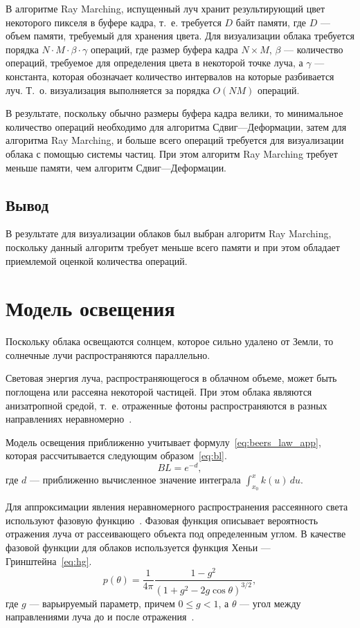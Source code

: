В алгоритме Ray Marching, испущенный луч хранит результирующий цвет некоторого пикселя в буфере кадра, т.~е. требуется $D$ байт памяти, где $D$ --- объем памяти, требуемый для хранения цвета. Для визуализации облака требуется порядка $N \cdot M \cdot \beta \cdot \gamma$ операций, где размер буфера кадра $N \times M$, $\beta$ --- количество операций, требуемое для определения цвета в некоторой точке луча, а $\gamma$ --- константа, которая обозначает количество интервалов на которые разбивается луч. Т.~о. визуализация выполняется за порядка $O(NM)$ операций.

В результате, поскольку обычно размеры буфера кадра велики, то минимальное количество операций необходимо для алгоритма Сдвиг---Деформации, затем для алгоритма Ray Marching, и больше всего операций требуется для визуализации облака с помощью системы частиц. При этом алгоритм Ray Marching требует меньше памяти, чем алгоритм Сдвиг---Деформации.

\subsection*{Вывод}
В результате для визуализации облаков был выбран алгоритм Ray Marching, поскольку данный алгоритм требует меньше всего памяти и при этом обладает приемлемой оценкой количества операций.

\section{Модель освещения}

Поскольку облака освещаются солнцем, которое сильно удалено от Земли, то солнечные лучи распространяются параллельно.

Световая энергия луча, распространяющегося в облачном объеме, может быть поглощена или рассеяна некоторой частицей. При этом облака являются анизатропной средой, т.~е. отраженные фотоны распространяются в разных направлениях неравномерно~\cite{clouds, partmedia, hzd, frostbite}.

Модель освещения приближенно учитывает формулу~\eqref{eq:beers_law_app}, которая рассчитывается следующим образом~\eqref{eq:bl}.
\begin{equation}
	\label{eq:bl}
	BL = e ^ {-d},
\end{equation}
где $ d $ --- приближенно вычисленное значение интеграла $\int_{x_0}^{x} k(u)\,du$.

Для аппроксимации явления неравномерного распространения рассеянного света используют фазовую функцию~\cite{partmedia, hzd, frostbite, clouds}.
Фазовая функция описывает вероятность отражения луча от рассеивающего объекта под определенным углом. 
В качестве фазовой функции для облаков используется функция Хеньи --- Гринштейна~\eqref{eq:hg}.  
\begin{equation}
	\label{eq:hg}
	p(\theta) = \frac{1}{4\pi} \frac{1 - g^2}{(1 + g^2 - 2g\cos \theta)^{3/2}},
\end{equation}
где $ g $ --- варьируемый параметр, причем $ 0 \leq g < 1 $, а $\theta$ --- угол между направлениями луча до и после отражения~\cite{clouds}.

